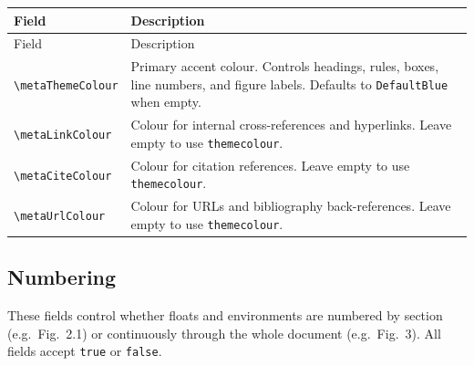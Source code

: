 	\begin{tabularx}{\linewidth}{@{}lL@{}}
		\caption{Colour metadata fields.}
		\label{tab:meta-colours} \\
		\toprule
		Field & Description \\
		\midrule
		\endfirsthead
		\toprule
		Field & Description \\
		\midrule
		\endhead
		\bottomrule
		\endfoot
		\bottomrule
		\endlastfoot
		\texttt{\textbackslash metaThemeColour} & Primary accent colour. Controls headings, rules, boxes, line numbers, and figure labels. Defaults to \texttt{DefaultBlue} when empty. \\
		\addlinespace
		
		\texttt{\textbackslash metaLinkColour}  & Colour for internal cross-references and hyperlinks. Leave empty to use \texttt{themecolour}. \\
		\addlinespace
		
		\texttt{\textbackslash metaCiteColour}  & Colour for citation references. Leave empty to use \texttt{themecolour}. \\
		\addlinespace
		
		\texttt{\textbackslash metaUrlColour}   & Colour for URLs and bibliography back-references. Leave empty to use \texttt{themecolour}. \\
	\end{tabularx}
	
	\subsection{Numbering}
	These fields control whether floats and environments are numbered by section (e.g.\ Fig.~2.1) or continuously through the whole document (e.g.\ Fig.~3). All fields accept \texttt{true} or \texttt{false}.
	
